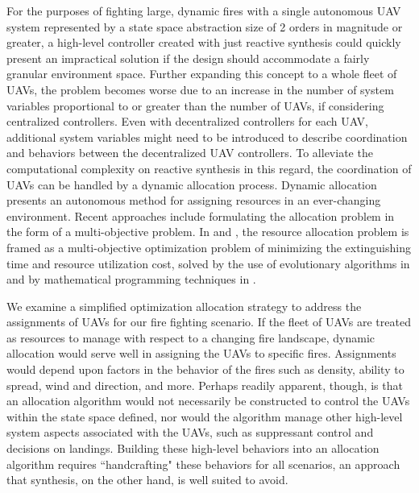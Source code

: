 \documentclass{ieeeaccess}
\begin{document}
For the purposes of fighting large, dynamic fires with a single autonomous UAV system represented by a state space abstraction size of 2 orders in magnitude or greater, a high-level controller created with just reactive synthesis could quickly present an impractical solution if the design should accommodate a fairly granular environment space. Further expanding this concept to a whole fleet of UAVs, the problem becomes worse due to an increase in the number of system variables proportional to or greater than the number of UAVs, if considering centralized controllers. Even with decentralized controllers for each UAV, additional system variables might need to be introduced to describe coordination and behaviors between the decentralized UAV controllers. To alleviate the computational complexity on reactive synthesis in this regard, the coordination of UAVs can be handled by a dynamic allocation process. Dynamic allocation presents an autonomous method for assigning resources in an ever-changing environment. Recent approaches include formulating the allocation problem in the form of a multi-objective problem. In \cite{c15} and \cite{16}, the resource allocation problem is framed as a multi-objective optimization problem of minimizing the extinguishing time and resource utilization cost, solved by the use of evolutionary algorithms in \cite{c15} and by mathematical programming techniques in \cite{16}. 

We examine a simplified optimization allocation strategy to address the assignments of UAVs for our fire fighting scenario. If the fleet of UAVs are treated as resources to manage with respect to a changing fire landscape, dynamic allocation would serve well in assigning the UAVs to specific fires. Assignments would depend upon factors in the behavior of the fires such as density, ability to spread, wind and direction, and more. Perhaps readily apparent, though, is that an allocation algorithm would not necessarily be constructed to control the UAVs within the state space defined, nor would the algorithm manage other high-level system aspects associated with the UAVs, such as suppressant control and decisions on landings. Building these high-level behaviors into an allocation algorithm requires ``handcrafting" these behaviors for all scenarios, an approach that synthesis, on the other hand, is well suited to avoid.
\end{document}
